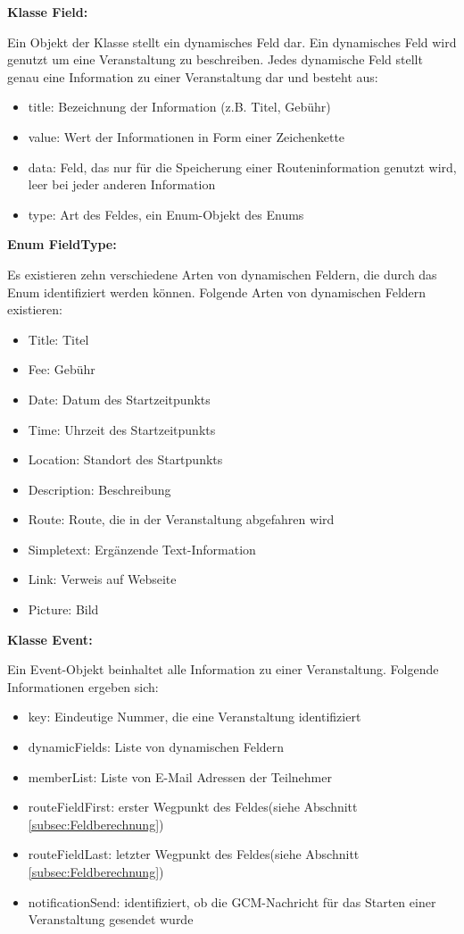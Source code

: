 \textbf{Klasse Field:}

Ein Objekt der Klasse  stellt ein dynamisches Feld dar. Ein dynamisches Feld wird genutzt um eine Veranstaltung zu beschreiben. Jedes dynamische Feld stellt genau eine Information zu einer Veranstaltung dar und besteht aus:

\begin{itemize}
	\item title: Bezeichnung der Information (z.B. \glqq Titel\grqq, \glqq Gebühr\grqq)
	\item value: Wert der Informationen in Form einer Zeichenkette
	\item data: Feld, das nur für die Speicherung einer Routeninformation genutzt wird, leer bei jeder anderen Information
	\item type: Art des Feldes, ein Enum-Objekt des Enums 
\end{itemize}

\textbf{Enum FieldType:}

Es existieren zehn verschiedene Arten von dynamischen Feldern, die durch das Enum  identifiziert werden können. Folgende Arten von dynamischen Feldern existieren:

\begin{itemize}
	\item Title: Titel
	\item Fee: Gebühr
	\item Date: Datum des Startzeitpunkts
	\item Time: Uhrzeit des Startzeitpunkts
	\item Location: Standort des Startpunkts
	\item Description: Beschreibung
	\item Route: Route, die in der Veranstaltung abgefahren wird
	\item Simpletext: Ergänzende Text-Information
	\item Link: Verweis auf Webseite
	\item Picture: Bild
\end{itemize}

\textbf{Klasse Event:}

Ein Event-Objekt beinhaltet alle Information zu einer Veranstaltung. Folgende Informationen ergeben sich:

\begin{itemize}
	\item key: Eindeutige Nummer, die eine Veranstaltung identifiziert
	\item dynamicFields: Liste von dynamischen Feldern
	\item memberList: Liste von E-Mail Adressen der Teilnehmer
	\item routeFieldFirst: erster Wegpunkt des Feldes(siehe Abschnitt \ref{subsec:Feldberechnung})
	\item routeFieldLast: letzter Wegpunkt des Feldes(siehe Abschnitt \ref{subsec:Feldberechnung})
	\item notificationSend: identifiziert, ob die GCM-Nachricht für das Starten einer Veranstaltung gesendet wurde
\end{itemize}

